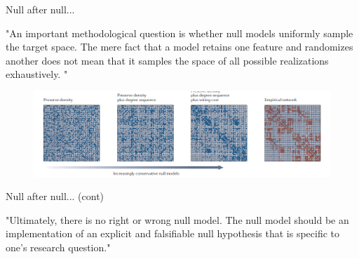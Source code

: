 \documentclass{beamer}
\begin{document}
	\begin{frame}{Null after null...}
		
		"An important methodological question
		is whether null models uniformly sample the target
		space. The mere fact that a model retains one feature
		and randomizes
		another does not mean that it samples
		the space of all possible realizations exhaustively. "
		\begin{figure}[h]
			\centering
				\includegraphics[scale=0.4]{../Figures/fig_null_models_3.png}
		\end{figure}	
	\end{frame}
\begin{frame}{Null after null... (cont)}	

	"Ultimately, there is no right or wrong null model. The
	null model should be an implementation of an explicit
	and falsifiable null hypothesis that is specific to one’s
	research question."
	
	
\end{frame}
	
\end{document}
